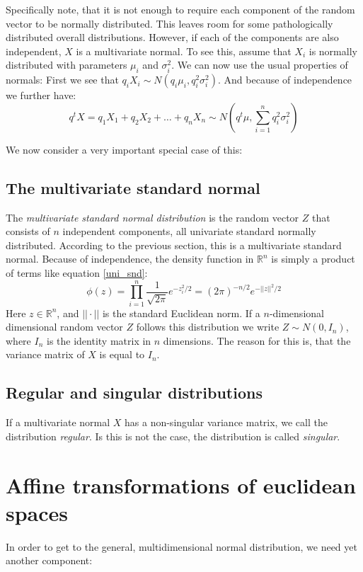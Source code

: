 \documentclass[12pt, a4paper]{article}
\numberwithin{equation}{section}
\begin{document}
Specifically note, that it is not enough to require each component of the random vector to be normally distributed. This leaves room for some pathologically distributed overall distributions. However, if each of the components are also independent, $X$ is a multivariate normal. To see this, assume that $X_i$ is normally distributed with parameters $\mu_i$ and $\sigma_i^2$. We can now use the usual properties of normals: First we see that $q_i X_i\sim N(q_i\mu_i,q_i^2\sigma_i^2)$. And because of independence we further have:
\begin{equation}
q^t X=q_1 X_1+q_2 X_2+\ldots +q_n X_n\sim N\left(q^t\mu,\sum_{i=1}^n q_i^2\sigma_i^2\right)
\end{equation}

We now consider a very important special case of this:

\subsection{The multivariate standard normal}
The \textit{multivariate standard normal distribution} is the random vector $Z$ that consists of $n$ independent components, all univariate standard normally distributed. According to the previous section, this is a multivariate standard normal. Because of independence, the density function in $\mathbb{R}^n$ is simply a product of terms like equation \ref{uni_snd}:
\begin{equation}
\phi(z)=\prod_{i=1}^n\frac{1}{\sqrt{2\pi}}e^{-z_i^2/2}=(2\pi)^{-n/2}e^{-||z||^2/2}
\end{equation}
Here $z\in\mathbb{R}^n$, and $||\cdot ||$ is the standard Euclidean norm. If a $n$-dimensional dimensional random vector $Z$ follows this distribution we write $Z\sim N(0,I_n)$, where $I_n$ is the identity matrix in $n$ dimensions. The reason for this is, that the variance matrix of $X$ is equal to $I_n$.

\subsection{Regular and singular distributions}
If a multivariate normal $X$ has a non-singular variance matrix, we call the distribution \textit{regular}. Is this is not the case, the distribution is called \textit{singular}.

\section{Affine transformations of euclidean spaces}
In order to get to the general, multidimensional normal distribution, we need yet another component:
\end{document}
